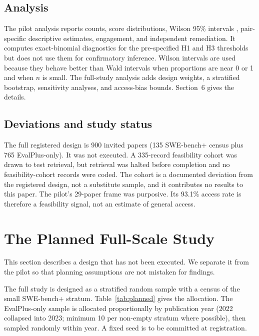 \documentclass[11pt,a4paper]{article}
\begin{document}
\subsection{Analysis}

The pilot analysis reports counts, score distributions, Wilson 95\% intervals \citep{wilson1927}, pair-specific descriptive estimates, engagement, and independent remediation. It computes exact-binomial diagnostics for the pre-specified H1 and H3 thresholds but does not use them for confirmatory inference. Wilson intervals are used because they behave better than Wald intervals when proportions are near 0 or 1 and when $n$ is small. The full-study analysis adds design weights, a stratified bootstrap, sensitivity analyses, and access-bias bounds. Section~6 gives the details.

\subsection{Deviations and study status}

The full registered design is 900 invited papers (135 SWE-bench+ census plus 765 EvalPlus-only). It was not executed. A 335-record feasibility cohort was drawn to test retrieval, but retrieval was halted before completion and no feasibility-cohort records were coded. The cohort is a documented deviation from the registered design, not a substitute sample, and it contributes no results to this paper. The pilot's 29-paper frame was purposive. Its 93.1\% access rate is therefore a feasibility signal, not an estimate of general access.

\section{The Planned Full-Scale Study}

This section describes a design that has not been executed. We separate it from the pilot so that planning assumptions are not mistaken for findings.

The full study is designed as a stratified random sample with a census of the small SWE-bench+ stratum. Table~\ref{tab:planned} gives the allocation. The EvalPlus-only sample is allocated proportionally by publication year (2022 collapsed into 2023; minimum 10 per non-empty stratum where possible), then sampled randomly within year. A fixed seed is to be committed at registration.
\end{document}
